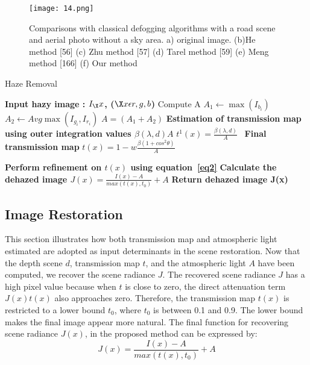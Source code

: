 \documentclass[doctor,english,listoffigures,listoftables]{thesis-uestc}
\begin{document}
\begin{figure}[H]
	\centering
	\texttt{[image: 14.png]}
	\caption{Comparisons with classical defogging algorithms with a road scene and aerial photo without a sky area. a) original image. (b)He method [56] (c) Zhu method [57] (d) Tarel method [59] (e) Meng method [166] (f) Our method}
	\label{fig14}
\end{figure}




\begin{algorithm}
	\caption{Haze Removal}
	\begin{algorithmic}[1]
	    \State \textbf{Input hazy image : $I_\X x$,  ($\X x \epsilon r,g,b$)}
		\State Compute A
		\State $A_1 \gets \max(I_b_i)$
		\State  $A_2 \gets Avg\max(I_g_i, I_r_i)$
		\State  $A = (A_1 +A_2)$
	    \EndFor
		\State \textbf{Estimation of transmission map using outer integration values ${\beta(\lambda,d)}{A}$}
		\State $t^1(x)=  \frac{\beta(\lambda,d)}{A}$\
		\EndFor
		\State \textbf{Final transmission map}
		      \State $t(x)= 1-w \frac{\beta(1+cos^2\theta )}{A}$\
		   
		  \STATE \textbf{Perform refinement on $t(x)$ using equation~\ref{eq2}}
		  \EndIf
		  \State \textbf{Calculate the dehazed image $J(x)=\frac{I(x)-A}{max(t(x),t_0)}+A $}
		  \State \textbf{Return dehazed image J(x)}
		  
	   
	\end{algorithmic} 
\end{algorithm} 
\subsection{Image Restoration }
This section illustrates how both transmission map and atmospheric light estimated are adopted as input determinants in the scene restoration. Now that the depth scene $d$, transmission map $t$, and the atmospheric light $A$ have been computed, we recover the scene radiance $J$. The recovered scene radiance $J$ has a high pixel value because when $t$ is close to zero, the direct attenuation term $J(x)t(x)$ also approaches zero. Therefore, the transmission map $t(x)$ is restricted to a lower bound $t_0$, where $t_0$ is between 0.1 and 0.9. The lower bound makes the final image appear more natural. The final function for recovering scene radiance $J(x)$, in the proposed method can be expressed by:
\begin{equation} \label{eq3}
J(x)=\frac{I(x)-A}{max(t(x),t_0)}+A 
\end{equation}
\end{document}
